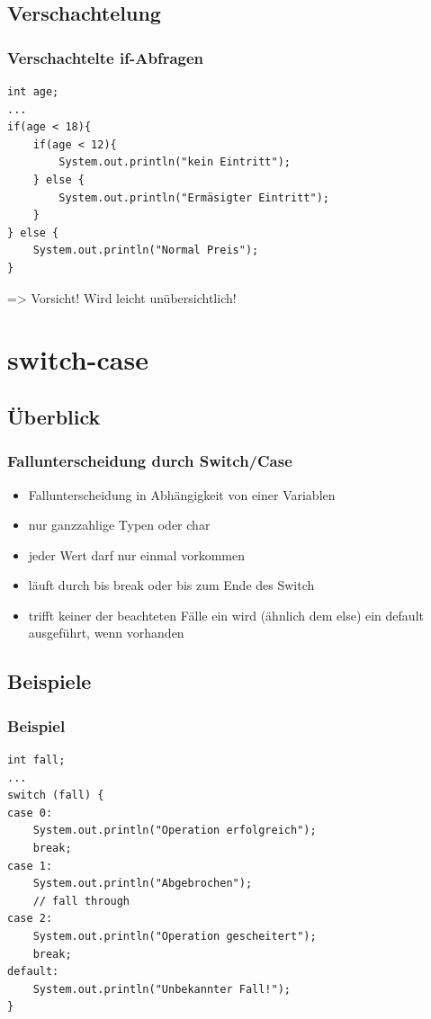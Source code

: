 \documentclass[final]{beamer}
\begin{document}
\subsection{Verschachtelung}
\begin{frame}[containsverbatim]
	\frametitle{Verschachtelte if-Abfragen}
	\begin{lstlisting}
int age;
...
if(age < 18){
	if(age < 12){
		System.out.println("kein Eintritt");
	} else {
		System.out.println("Ermäsigter Eintritt");
	}
} else {
	System.out.println("Normal Preis");
}
	\end{lstlisting}
	=> Vorsicht! Wird leicht unübersichtlich!
\end{frame}

\section{switch-case}
\subsection{Überblick}
\begin{frame}[containsverbatim]
	\frametitle{Fallunterscheidung durch Switch/Case}
	\begin{itemize}
	\item{Fallunterscheidung in Abhängigkeit von einer Variablen}
	\item{nur ganzzahlige Typen oder char}
	\item{jeder Wert darf nur einmal vorkommen}
	\item{läuft durch bis break oder bis zum Ende des Switch}
	\item{trifft keiner der beachteten Fälle ein wird (ähnlich dem else) ein default ausgeführt, wenn vorhanden}
  \end{itemize}
\end{frame}


\subsection{Beispiele}
\begin{frame}[containsverbatim]
	\frametitle{Beispiel}
	\begin{lstlisting}
int fall;
...
switch (fall) {
case 0:
	System.out.println("Operation erfolgreich");
	break;
case 1:
	System.out.println("Abgebrochen");
	// fall through
case 2:
	System.out.println("Operation gescheitert");
	break;
default:
	System.out.println("Unbekannter Fall!");
}
	\end{lstlisting}
\end{frame}
\end{document}
